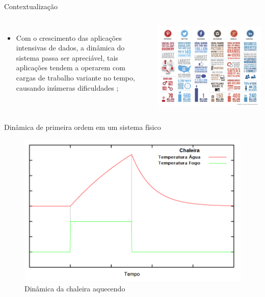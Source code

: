\begin{frame}{Contextualização}
	\begin{columns}
		\begin{minipage}[c][0.25\textheight][c]{\linewidth}
			\begin{itemize}
				\item Com o crescimento das aplicações intensivas de dados, a dinâmica do sistema passa ser apreciável, tais aplicações tendem a operarem com cargas de trabalho variante no	tempo, causando inúmeras dificuldades \cite{Padala2007}; 				
			\end{itemize}
		\end{minipage}
		\begin{minipage}[c][0.4\textheight][c]{\linewidth}
			\centering
			\includegraphics[scale=0.27]{images/social-media-networks.png}
		\end{minipage}		
	\end{columns}	
\end{frame}


\begin{frame}{Dinâmica de primeira ordem em um sistema físico}
	\begin{figure}[htb]
		\centering
		\includegraphics[scale=0.4]{../monograph/images/grafico-chaleira.png}	
		\caption{Dinâmica da chaleira aquecendo \cite{Janert2013}}
	\end{figure}
\end{frame}

